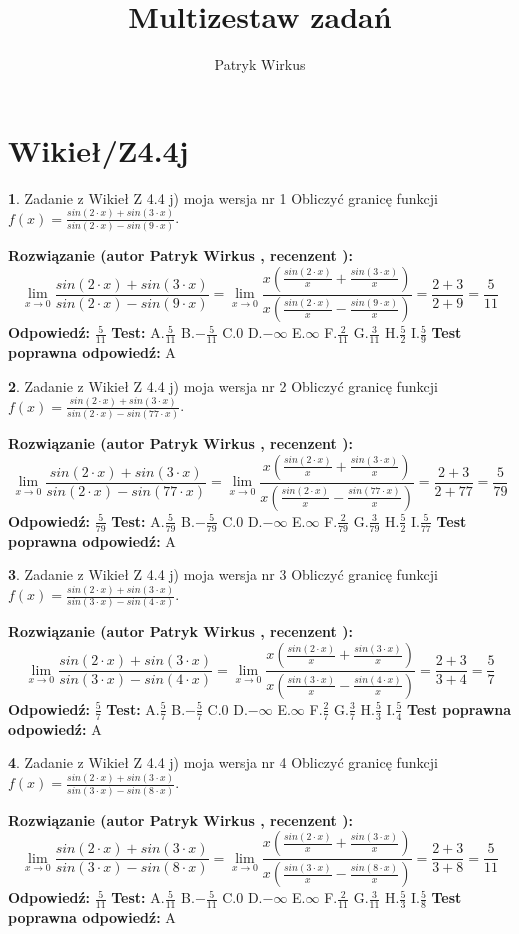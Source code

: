 \documentclass[12pt, a4paper]{article}
\title{Multizestaw zadań}
\author{Patryk Wirkus}
\date{}
\theoremstyle{definition} %
\newtheorem{zad}{}
\newcommand{\kategoria}[1]{\section{#1}}
\newcommand{\zadStart}[1]{\begin{zad}#1\newline}
\newcommand{\zadStop}{\end{zad}}
\newcommand{\rozwStart}[2]{\noindent \textbf{Rozwiązanie (autor #1 , recenzent #2): }\newline}
\newcommand{\rozwStop}{\newline}
\newcommand{\odpStart}{\noindent \textbf{Odpowiedź:}\newline}
\newcommand{\odpStop}{\newline}
\newcommand{\testStart}{\noindent \textbf{Test:}\newline}
\newcommand{\testStop}{\newline}
\newcommand{\kluczStart}{\noindent \textbf{Test poprawna odpowiedź:}\newline}
\newcommand{\kluczStop}{\newline}
\begin{document}
\maketitle

\kategoria{Wikieł/Z4.4j}


\zadStart{Zadanie z Wikieł Z 4.4 j) moja wersja nr 1}
Obliczyć granicę funkcji $f(x)=\frac{sin(2\cdot x) +sin(3\cdot x)}{sin(2\cdot x) -sin(9\cdot x)}$.
\zadStop
\rozwStart{Patryk Wirkus}{}
$$\lim\limits_{x\to 0}\frac{sin(2\cdot x) +sin(3\cdot x)}{sin(2\cdot x) -sin(9\cdot x)}=\lim\limits_{x\to 0}\frac{x(\frac{sin(2\cdot x)}{x}+\frac{sin(3\cdot x)}{x})}{x(\frac{sin(2\cdot x)}{x}-\frac{sin(9\cdot x)}{x})}=\frac{2+3}{2+9} = \frac{5}{11}$$
\rozwStop
\odpStart
$\frac{5}{11}$
\odpStop
\testStart
A.$\frac{5}{11}$
B.$-\frac{5}{11}$
C.$0$
D.$-\infty$
E.$\infty$
F.$\frac{2}{11}$
G.$\frac{3}{11}$
H.$\frac{5}{2}$
I.$\frac{5}{9}$
\testStop
\kluczStart
A
\kluczStop



\zadStart{Zadanie z Wikieł Z 4.4 j) moja wersja nr 2}
Obliczyć granicę funkcji $f(x)=\frac{sin(2\cdot x) +sin(3\cdot x)}{sin(2\cdot x) -sin(77\cdot x)}$.
\zadStop
\rozwStart{Patryk Wirkus}{}
$$\lim\limits_{x\to 0}\frac{sin(2\cdot x) +sin(3\cdot x)}{sin(2\cdot x) -sin(77\cdot x)}=\lim\limits_{x\to 0}\frac{x(\frac{sin(2\cdot x)}{x}+\frac{sin(3\cdot x)}{x})}{x(\frac{sin(2\cdot x)}{x}-\frac{sin(77\cdot x)}{x})}=\frac{2+3}{2+77} = \frac{5}{79}$$
\rozwStop
\odpStart
$\frac{5}{79}$
\odpStop
\testStart
A.$\frac{5}{79}$
B.$-\frac{5}{79}$
C.$0$
D.$-\infty$
E.$\infty$
F.$\frac{2}{79}$
G.$\frac{3}{79}$
H.$\frac{5}{2}$
I.$\frac{5}{77}$
\testStop
\kluczStart
A
\kluczStop



\zadStart{Zadanie z Wikieł Z 4.4 j) moja wersja nr 3}
Obliczyć granicę funkcji $f(x)=\frac{sin(2\cdot x) +sin(3\cdot x)}{sin(3\cdot x) -sin(4\cdot x)}$.
\zadStop
\rozwStart{Patryk Wirkus}{}
$$\lim\limits_{x\to 0}\frac{sin(2\cdot x) +sin(3\cdot x)}{sin(3\cdot x) -sin(4\cdot x)}=\lim\limits_{x\to 0}\frac{x(\frac{sin(2\cdot x)}{x}+\frac{sin(3\cdot x)}{x})}{x(\frac{sin(3\cdot x)}{x}-\frac{sin(4\cdot x)}{x})}=\frac{2+3}{3+4} = \frac{5}{7}$$
\rozwStop
\odpStart
$\frac{5}{7}$
\odpStop
\testStart
A.$\frac{5}{7}$
B.$-\frac{5}{7}$
C.$0$
D.$-\infty$
E.$\infty$
F.$\frac{2}{7}$
G.$\frac{3}{7}$
H.$\frac{5}{3}$
I.$\frac{5}{4}$
\testStop
\kluczStart
A
\kluczStop



\zadStart{Zadanie z Wikieł Z 4.4 j) moja wersja nr 4}
Obliczyć granicę funkcji $f(x)=\frac{sin(2\cdot x) +sin(3\cdot x)}{sin(3\cdot x) -sin(8\cdot x)}$.
\zadStop
\rozwStart{Patryk Wirkus}{}
$$\lim\limits_{x\to 0}\frac{sin(2\cdot x) +sin(3\cdot x)}{sin(3\cdot x) -sin(8\cdot x)}=\lim\limits_{x\to 0}\frac{x(\frac{sin(2\cdot x)}{x}+\frac{sin(3\cdot x)}{x})}{x(\frac{sin(3\cdot x)}{x}-\frac{sin(8\cdot x)}{x})}=\frac{2+3}{3+8} = \frac{5}{11}$$
\rozwStop
\odpStart
$\frac{5}{11}$
\odpStop
\testStart
A.$\frac{5}{11}$
B.$-\frac{5}{11}$
C.$0$
D.$-\infty$
E.$\infty$
F.$\frac{2}{11}$
G.$\frac{3}{11}$
H.$\frac{5}{3}$
I.$\frac{5}{8}$
\testStop
\kluczStart
A
\kluczStop
\end{document}

